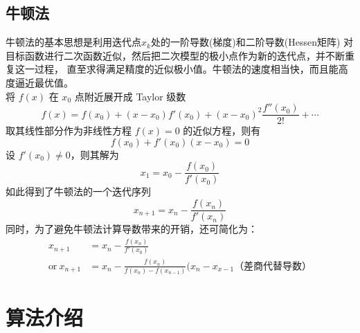 \documentclass{ctexart}
\begin{document}
    \subsection{牛顿法}\label{S2.2}

    牛顿法的基本思想是利用迭代点$x_k$处的一阶导数(梯度)和二阶导数(Hessen矩阵)
    对目标函数进行二次函数近似，然后把二次模型的极小点作为新的迭代点，并不断重复这一过程，
    直至求得满足精度的近似极小值。牛顿法的速度相当快，而且能高度逼近最优值。\\
    将 $f(x)$ 在 $x_0$ 点附近展开成 Taylor 级数\\
    \begin{equation}
        \label{E3}
        f(x) = f(x_0) + (x-x_0)f'(x_0) + (x-x_0)^2\frac{f''(x_0)}{2!} + \cdots
    \end{equation}
    取其线性部分作为非线性方程 $f(x) = 0$ 的近似方程，则有\\
    \begin{equation}
        \label{E4}
        f(x_0) + f'(x_0)(x-x_0) = 0
    \end{equation}
    设 $f'(x_0)\neq 0$，则其解为\\
    \begin{equation}
        \label{E5}
        x_1 = x_0 - \frac{f(x_0)}{f'(x_0)}
    \end{equation}
    如此得到了牛顿法的一个迭代序列
    \begin{equation}
        \label{E6}
        x_{n+1} = x_n - \frac{f(x_n)}{f'(x_n)}
    \end{equation}
    同时，为了避免牛顿法计算导数带来的开销，还可简化为：
    \begin{equation}
        \label{E7}
        \begin{aligned}
            x_{n+1} &= x_n - \frac{f(x_n)}{f'(x_0)}\\
            \text{or}\ x_{n+1} &= x_n - \frac{f(x_n)}{f(x_n) - f(x_{n-1})}(x_n-x_{x-1}\text{（差商代替导数）}
        \end{aligned}
    \end{equation}


    \section{算法介绍}\label{S3}
\end{document}
